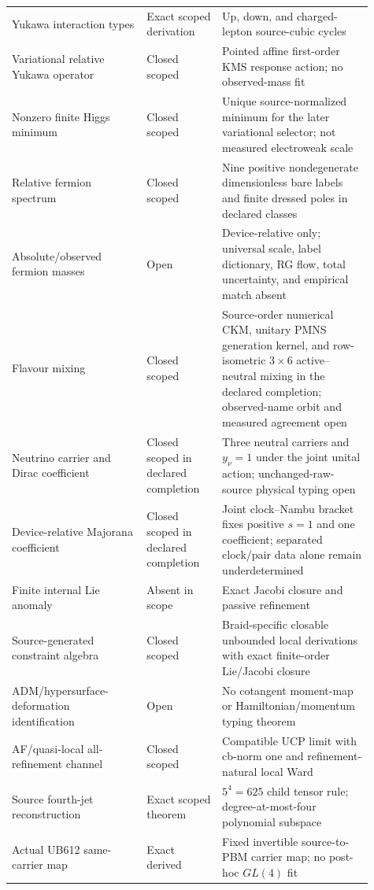 \documentclass[11pt]{article}
\theoremstyle{definition}
\theoremstyle{remark}
\begin{document}
\begin{longtable}{>{\raggedright\arraybackslash}p{0.34\linewidth} >{\raggedright\arraybackslash}p{0.19\linewidth} >{\raggedright\arraybackslash}p{0.38\linewidth}}
Yukawa interaction types & Exact scoped derivation & Up, down, and charged-lepton source-cubic cycles \\
Variational relative Yukawa operator & Closed scoped & Pointed affine first-order KMS response action; no observed-mass fit \\
Nonzero finite Higgs minimum & Closed scoped & Unique source-normalized minimum for the later variational selector; not measured electroweak scale \\
Relative fermion spectrum & Closed scoped & Nine positive nondegenerate dimensionless bare labels and finite dressed poles in declared classes \\
Absolute/observed fermion masses & Open & Device-relative only; universal scale, label dictionary, RG flow, total uncertainty, and empirical match absent \\
Flavour mixing & Closed scoped & Source-order numerical CKM, unitary PMNS generation kernel, and row-isometric $3\times6$ active--neutral mixing in the declared completion; observed-name orbit and measured agreement open \\
Neutrino carrier and Dirac coefficient & Closed scoped in declared completion & Three neutral carriers and $y_\nu=1$ under the joint unital action; unchanged-raw-source physical typing open \\
Device-relative Majorana coefficient & Closed scoped in declared completion & Joint clock--Nambu bracket fixes positive $s=1$ and one coefficient; separated clock/pair data alone remain underdetermined \\
Finite internal Lie anomaly & Absent in scope & Exact Jacobi closure and passive refinement \\
Source-generated constraint algebra & Closed scoped & Braid-specific closable unbounded local derivations with exact finite-order Lie/Jacobi closure \\
ADM/hypersurface-deformation identification & Open & No cotangent moment-map or Hamiltonian/momentum typing theorem \\
AF/quasi-local all-refinement channel & Closed scoped & Compatible UCP limit with cb-norm one and refinement-natural local Ward \\
Source fourth-jet reconstruction & Exact scoped theorem & $5^4=625$ child tensor rule; degree-at-most-four polynomial subspace \\
Actual UB612 same-carrier map & Exact derived & Fixed invertible source-to-PBM carrier map; no post-hoc $GL(4)$ fit \\

\end{longtable}
\end{document}
